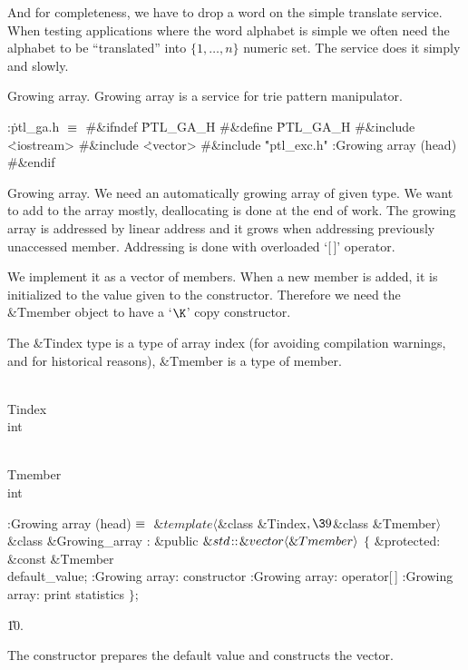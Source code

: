 \fi

And for completeness, we have to drop a word on the simple translate
service.  When testing applications where the word alphabet is simple we
often need the alphabet to be ``translated'' into $\{1,\dots,n\}$ numeric
set. The service does it simply and slowly.

\fi

Growing array. Growing array is a service for trie pattern
manipulator.

\Y\B\4:\.{ptl\_ga.h }\X${}\equiv{}$\6
\8\#\&{ifndef} \.{PTL\_GA\_H}\6
\8\#\&{define} \.{PTL\_GA\_H}\6
\8\#\&{include} \.{<iostream>}\6
\8\#\&{include} \.{<vector>}\6
\8\#\&{include} \.{"ptl\_exc.h"}\6
:Growing array (head)\X\6
\8\#\&{endif}\par
\fi

Growing array. We need an automatically growing array of given type.
We want to add to the array mostly, deallocating is done at the end of
work. The growing array is addressed by linear address and it grows when
addressing previously unaccessed member. Addressing is done with
overloaded `[\,]' operator.

We implement it as a vector of members. When a new member is added, it
is initialized to the value given to the constructor. Therefore we need
the \&{Tmember} object to have a `$\K$' copy constructor.

The \&{Tindex} type is a type of array index (for avoiding compilation
warnings, and for historical reasons), \&{Tmember} is a type of member.

\Y\B\F\\{Tindex} \5
\\{int}\par
\B\F\\{Tmember} \5
\\{int}\par
\Y\B\4:Growing array (head)\X${}\equiv{}$\6
$\&{template}\langle{}$\&{class} \&{Tindex}${},\39{}$\&{class} \&{Tmember}${}%
\rangle{}$\6
\&{class} \&{Growing\_array} :\6
\&{public} ${}\&{std}\kern.1em{::}\kern.1em\&{vector}\langle\&{Tmember}\rangle{}$ ${}\{{}$\1\6
\4\&{protected}:\6
\&{const} \&{Tmember} \\{default\_value};\7
:Growing array: constructor\X\6
:Growing array: operator[\,]\X\6
:Growing array: print statistics\X\2\6
${}\}{}$;\par
\U10.\fi

The constructor prepares the default value and constructs the vector.

